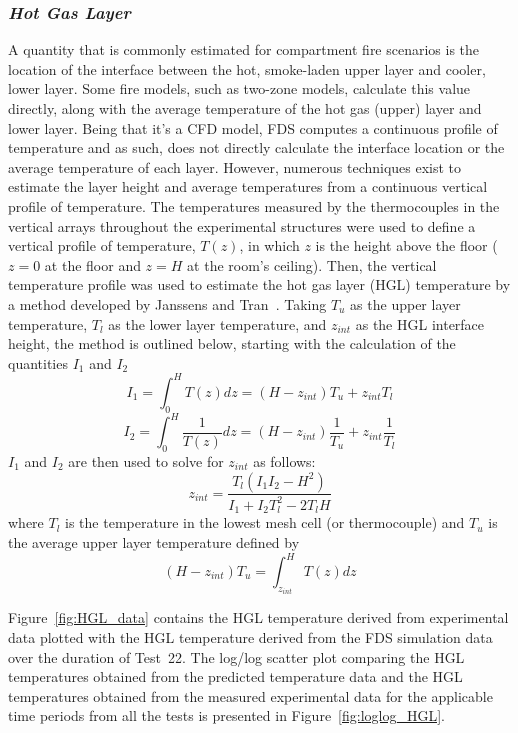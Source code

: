 \subsubsection*{\textit{Hot Gas Layer}}
A quantity that is commonly estimated for compartment fire scenarios is the location of the interface between the hot, smoke-laden upper layer and cooler, lower layer. Some fire models, such as two-zone models, calculate this value directly, along with the average temperature of the hot gas (upper) layer and lower layer. Being that it's a CFD model, FDS computes a continuous profile of temperature and as such, does not directly calculate the interface location or the average temperature of each layer. However, numerous techniques exist to estimate the layer height and average temperatures from a continuous vertical profile of temperature. The temperatures measured by the thermocouples in the vertical arrays throughout the experimental structures were used to define a vertical profile of temperature, $T(z)$, in which $z$ is the height above the floor ($z=0$ at the floor and $z=H$ at the room's ceiling). Then, the vertical temperature profile was used to estimate the hot gas layer (HGL) temperature by a method developed by Janssens and Tran~\cite{Janssens:JFS1992}. Taking $T_u$ as the upper layer temperature, $T_l$ as the lower layer temperature, and $z_{int}$ as the HGL interface height, the method is outlined below, starting with the calculation of the quantities $I_1$ and $I_2$
\begin{equation*}
	I_1 = \int^H_0 T(z)dz = (H-z_{int})T_u+z_{int}T_l
\end{equation*}
\begin{equation*}
	I_2 = \int^H_0 \frac{1}{T(z)}dz = (H-z_{int})\frac{1}{T_u}+z_{int}\frac{1}{T_l}
\end{equation*}
$I_1$ and $I_2$ are then used to solve for $z_{int}$ as follows:
\begin{equation}
	z_{int}=\frac{T_l(I_1I_2-H^2)}{I_1+I_2 T_l^2-2T_l H}
\end{equation}
where $T_l$ is the temperature in the lowest mesh cell (or thermocouple) and $T_u$ is the average upper layer temperature defined by
\begin{equation}
	(H-z_{int})T_u=\int^H_{z_{int}} T(z)dz
\end{equation}

Figure~\ref{fig:HGL_data} contains the HGL temperature derived from experimental data plotted with the HGL temperature derived from the FDS simulation data over the duration of Test~22. The log/log scatter plot comparing the HGL temperatures obtained from the predicted temperature data and the HGL temperatures obtained from the measured experimental data for the applicable time periods from all the tests is presented in Figure~\ref{fig:loglog_HGL}.

